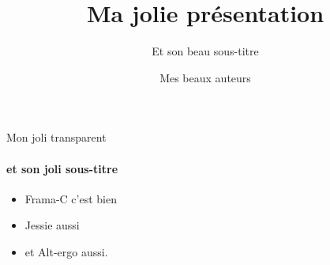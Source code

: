 \documentclass{beamer}
\title{Ma jolie présentation}
\subtitle{Et son beau sous-titre}
\author{\alert{Mes beaux auteurs}}
\begin{document}
\begin{frame}
\maketitle
\end{frame}

\begin{frame}{Mon joli transparent}
\framesubtitle{et son joli sous-titre}
\begin{itemize}
\item Frama-C c'est bien
\item Jessie aussi
\item et Alt-ergo aussi.
\end{itemize}
\end{frame}
\end{document}
